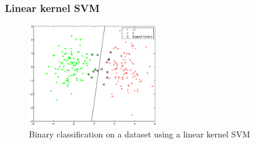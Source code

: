 \documentclass{beamer}
\begin{document}
    \begin{frame}
        \frametitle{Linear kernel SVM}
        \begin{figure}
            \centering
            \includegraphics[width=0.5\textwidth]{figures/svm_linear_classification.eps}
            \caption{Binary classification on a dataset using a linear kernel SVM}
        \end{figure}
    \end{frame}
    
\end{document}
